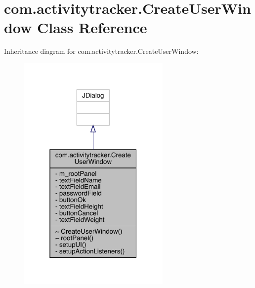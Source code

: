 \hypertarget{classcom_1_1activitytracker_1_1_create_user_window}{}\section{com.\+activitytracker.\+Create\+User\+Window Class Reference}
\label{classcom_1_1activitytracker_1_1_create_user_window}


Inheritance diagram for com.\+activitytracker.\+Create\+User\+Window\+:
\nopagebreak
\begin{figure}[H]
\begin{center}
\leavevmode
\includegraphics[width=211pt]{classcom_1_1activitytracker_1_1_create_user_window__inherit__graph}
\end{center}
\end{figure}


